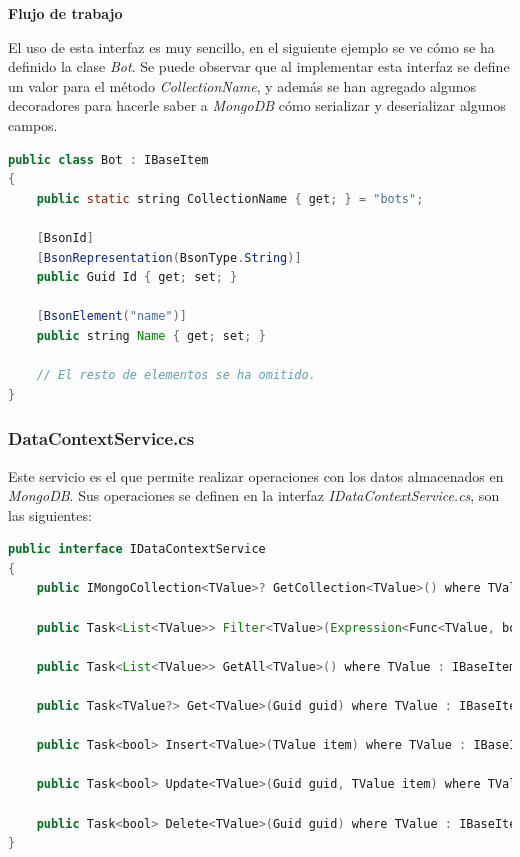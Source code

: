 \medskip 

\textbf{Flujo de trabajo}

El uso de esta interfaz es muy sencillo, en el siguiente ejemplo se ve cómo se ha definido la clase \textit{Bot}. Se puede observar que al implementar esta interfaz se define un valor para el método \textit{CollectionName}, y además se han agregado algunos decoradores para hacerle saber a \textit{MongoDB} cómo serializar y deserializar algunos campos.

\begin{lstlisting}[language=java]
public class Bot : IBaseItem
{
    public static string CollectionName { get; } = "bots";

    [BsonId]
    [BsonRepresentation(BsonType.String)]
    public Guid Id { get; set; }
    
    [BsonElement("name")]
    public string Name { get; set; }
    
    // El resto de elementos se ha omitido.
}
\end{lstlisting}

\subsubsection{DataContextService.cs}
\label{sec:datacontextservice}


Este servicio es el que permite realizar operaciones con los datos almacenados en \textit{MongoDB}. Sus operaciones se definen en la interfaz \textit{IDataContextService.cs}, son las siguientes:

\begin{lstlisting}[language=java]
public interface IDataContextService
{
    public IMongoCollection<TValue>? GetCollection<TValue>() where TValue : IBaseItem;

    public Task<List<TValue>> Filter<TValue>(Expression<Func<TValue, bool>> filter) where TValue : IBaseItem;

    public Task<List<TValue>> GetAll<TValue>() where TValue : IBaseItem;

    public Task<TValue?> Get<TValue>(Guid guid) where TValue : IBaseItem;

    public Task<bool> Insert<TValue>(TValue item) where TValue : IBaseItem;

    public Task<bool> Update<TValue>(Guid guid, TValue item) where TValue : IBaseItem;

    public Task<bool> Delete<TValue>(Guid guid) where TValue : IBaseItem;
}
\end{lstlisting}

